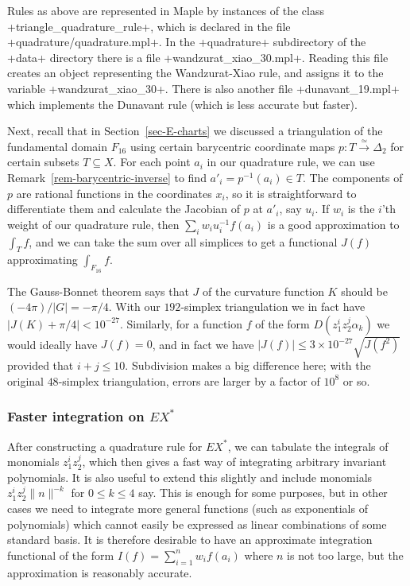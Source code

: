 \documentclass[reqno]{amsart}
\newcommand{\Dl}        {\Delta}
\newcommand{\al}        {\alpha}
\newcommand{\xra}       {\xrightarrow}
\newcommand{\tm}        {\times}
\newcommand{\sse}       {\subseteq}
\renewcommand{\:}{\colon}
\theoremstyle{definition}
\begin{document}
Rules as above are represented in Maple by instances of the class
\mcode+triangle_quadrature_rule+, which is declared in the file
\fname+quadrature/quadrature.mpl+.  In the \fname+quadrature+
subdirectory of the \mcode+data+ directory there is a file
\mcode+wandzurat_xiao_30.mpl+.  Reading this file creates an object
representing the Wandzurat-Xiao rule, and assigns it to the variable
\mcode+wandzurat_xiao_30+.  There is also another file
\mcode+dunavant_19.mpl+ which implements the Dunavant rule (which is
less accurate but faster).

Next, recall that in Section~\ref{sec-E-charts} we discussed a
triangulation of the fundamental domain $F_{16}$ using certain
barycentric coordinate maps $p:T\xra{\simeq}\Dl_2$ for certain subsets
$T\sse X$.  For each point $a_i$ in our quadrature rule, we can use
Remark~\ref{rem-barycentric-inverse} to find $a'_i=p^{-1}(a_i)\in T$.
The components of $p$ are rational functions in the
coordinates $x_i$, so it is straightforward to differentiate them and
calculate the Jacobian of $p$ at $a'_i$, say $u_i$.  If $w_i$ is the
$i$'th weight of our quadrature rule, then $\sum_iw_iu_i^{-1}f(a_i)$
is a good approximation to $\int_Tf$, and we can take the sum over all
simplices to get a functional $J(f)$ approximating $\int_{F_{16}}f$.

The Gauss-Bonnet theorem says that $J$ of the curvature function $K$
should be $(-4\pi)/|G|=-\pi/4$.  With our $192$-simplex triangulation
we in fact have $|J(K)+\pi/4|<10^{-27}$.  Similarly, for a function
$f$ of the form $D(z_1^iz_2^j\al_k)$ we would ideally have $J(f)=0$,
and in fact we have $|J(f)|\leq 3\tm 10^{-27}\sqrt{J(f^2)}$ provided
that $i+j\leq 10$.  Subdivision makes a big difference here; with the
original $48$-simplex triangulation, errors are larger by a factor of
$10^8$ or so.

\subsubsection{Faster integration on \texorpdfstring{$EX^*$}{EX*}}

After constructing a quadrature rule for $EX^*$, we can tabulate the
integrals of monomials $z_1^iz_2^j$, which then gives a fast way of
integrating arbitrary invariant polynomials.  It is also useful to
extend this slightly and include monomials $z_1^iz_2^j\|n\|^{-k}$ for
$0\leq k\leq 4$ say.  This is enough for some purposes, but in other
cases we need to integrate more general functions (such as
exponentials of polynomials) which cannot easily be expressed as
linear combinations of some standard basis.  It is therefore desirable
to have an approximate integration functional of the form
$I(f)=\sum_{i=1}^n w_if(a_i)$ where $n$ is not too large, but the
approximation is reasonably accurate.
\end{document}
